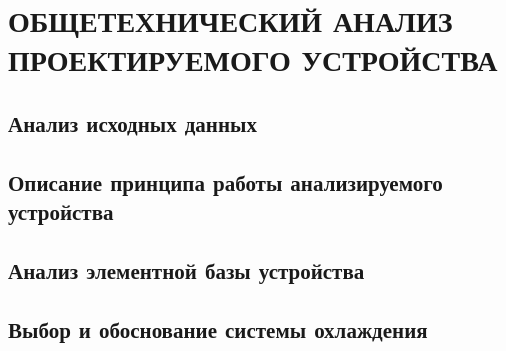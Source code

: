 \section{ОБЩЕТЕХНИЧЕСКИЙ АНАЛИЗ ПРОЕКТИРУЕМОГО УСТРОЙСТВА}
\subsection{Анализ исходных данных}

\subsection{Описание принципа работы анализируемого устройства}
\subsection{Анализ элементной базы устройства}
\subsection{Выбор и обоснование системы охлаждения}

\newpage